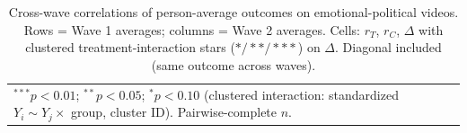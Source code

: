 \begin{table}
\begin{center}
\begin{tabular}{lcccccc}
\hline
\multicolumn{7}{l}{\scriptsize{$^{***}p<0.01$; $^{**}p<0.05$; $^{*}p<0.10$ (clustered interaction: standardized $Y_i \sim Y_j \times$ group, cluster ID). Pairwise-complete $n$.}} \\
\end{tabular}
\caption{Cross-wave correlations of person-average outcomes on emotional-political videos. Rows = Wave 1 averages; columns = Wave 2 averages. Cells: $r_{T}$, $r_{C}$, $\Delta$ with clustered treatment-interaction stars ($*/**/***$) on $\Delta$. Diagonal included (same outcome across waves).}
\label{tab:outcome_cors_person_w9_w10}
\end{center}
\end{table}
